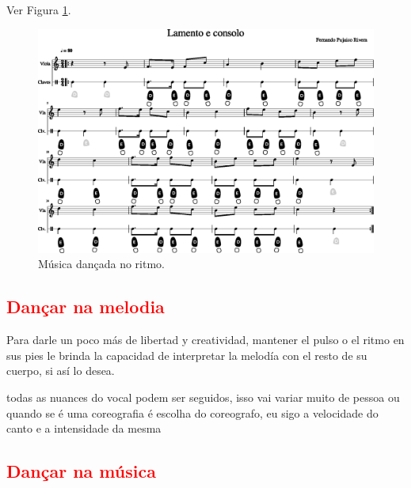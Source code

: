 Ver Figura \ref{fig:lamentoconsoloritmo1}.
\begin{figure}
    \centering
    \includegraphics[width=\textwidth]{chapters/cap-musicalidade-tecnica/lamento-e-consolo-clave-ritmo-1.eps}
    \caption{Música dançada no ritmo.}
    \label{fig:lamentoconsoloritmo1}
\end{figure}

\subsection{\textcolor{red}{Dançar na melodia}}
Para darle un poco más de libertad y creatividad, 
mantener el pulso o el ritmo en sus pies le brinda la capacidad de interpretar 
la melodía con el resto de su cuerpo, si así lo desea.

todas as nuances do vocal podem ser seguidos, 
isso vai variar muito de pessoa ou quando se é uma coreografia é escolha do coreografo, 
eu sigo a velocidade do canto e a intensidade da mesma

\subsection{\textcolor{red}{Dançar na música}}

